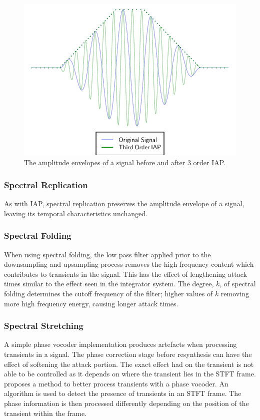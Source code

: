 			\begin{figure}[h!]
				\centering
				\includegraphics{chapter5/Images/IAPTemporalEffects.pdf}
				\caption{The amplitude envelopes of a signal before and after 3 order IAP.}
				\label{fig:IAPTemporalEffects}
			\end{figure}
			
		\subsubsection*{Spectral Replication}
			As with IAP, spectral replication preserves the amplitude envelope of a signal, leaving its
			temporal characteristics unchanged.

		\subsubsection*{Spectral Folding}
			When using spectral folding, the low pass filter applied prior to the downsampling and upsampling
			process removes the high frequency content which contributes to transients in the signal. This has
			the effect of lengthening attack times similar to the effect seen in the integrator system. The
			degree, $k$, of spectral folding determines the cutoff frequency of the filter; higher values of
			$k$ removing more high frequency energy, causing longer attack times.

		\subsubsection*{Spectral Stretching}
			A simple phase vocoder implementation produces artefacts when processing transients in a signal.
			The phase correction stage before resynthesis can have the effect of softening the attack portion.
			The exact effect had on the transient is not able to be controlled as it depends on where the
			transient lies in the STFT frame. \citet{robel2003a} proposes a method to better process transients
			with a phase vocoder. An algorithm is used to detect the presence of transients in an STFT frame.
			The phase information is then processed differently depending on the position of the transient
			within the frame.


